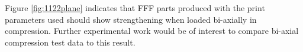 \documentclass[main.tex]{subfiles}
\begin{document}
Figure \ref{fig:1122plane} indicates that FFF parts produced with the print parameters used should show strengthening when loaded bi-axially in compression. Further experimental work would be of interest to compare bi-axial compression test data to this result.


% 

\end{document}
